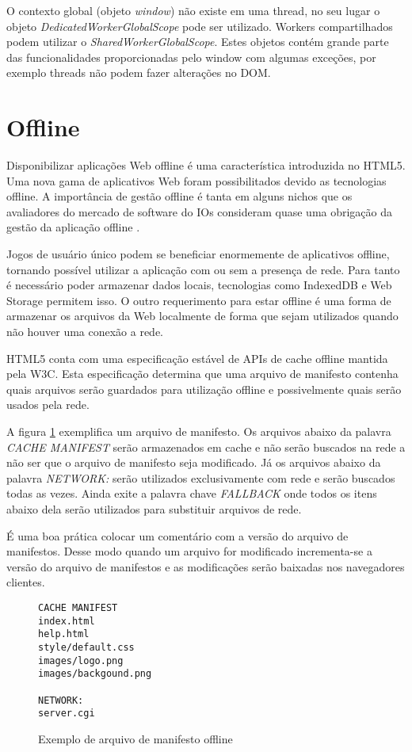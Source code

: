 O contexto global (objeto \textit{window}) não existe em uma
thread, no seu lugar o objeto \textit{DedicatedWorkerGlobalScope}
pode ser utilizado. Workers compartilhados podem utilizar o
\textit{SharedWorkerGlobalScope}. Estes objetos contém grande parte das
funcionalidades proporcionadas pelo window com algumas exceções, por
exemplo threads não podem fazer alterações no DOM.

\section{Offline}
Disponibilizar aplicações Web offline é uma característica
introduzida no HTML5. Uma nova gama de aplicativos Web foram
possibilitados devido as tecnologias offline. A importância de gestão
offline é tanta em alguns nichos que os avaliadores do mercado
de software do IOs consideram quase uma obrigação da gestão da
aplicação offline \autocite{publishHtml5}.

Jogos de usuário único podem se beneficiar enormemente de aplicativos
offline, tornando possível utilizar a aplicação com ou sem a
presença de rede. Para tanto é necessário poder armazenar dados
locais, tecnologias como IndexedDB e Web Storage permitem isso. O outro
requerimento para estar offline é uma forma de armazenar os arquivos
da Web localmente de forma que sejam utilizados quando não houver uma
conexão a rede.

HTML5 conta com uma especificação estável de APIs de cache offline
mantida pela W3C. Esta especificação determina que uma arquivo de
manifesto contenha quais arquivos serão guardados para utilização
offline e possivelmente quais serão usados pela rede.

A figura \ref{fig:offline} exemplifica um arquivo de manifesto. Os
arquivos abaixo da palavra \textit{CACHE MANIFEST} serão armazenados
em cache e não serão buscados na rede a não ser que o arquivo
de manifesto seja modificado. Já os arquivos abaixo da palavra
\textit{NETWORK:} serão utilizados exclusivamente com rede e serão
buscados todas as vezes. Ainda exite a palavra chave \textit{FALLBACK}
onde todos os itens abaixo dela serão utilizados para substituir
arquivos de rede.

É uma boa prática colocar um comentário com a versão do arquivo de
manifestos. Desse modo quando um arquivo for modificado incrementa-se a
versão do arquivo de manifestos e as modificações serão baixadas nos
navegadores clientes.

\begin{figure}[H]
\centering
\begin{verbatim}
CACHE MANIFEST
index.html
help.html
style/default.css
images/logo.png
images/backgound.png

NETWORK:
server.cgi
\end{verbatim}
\caption{Exemplo de arquivo de manifesto offline}
\label{fig:offline}
\end{figure}

